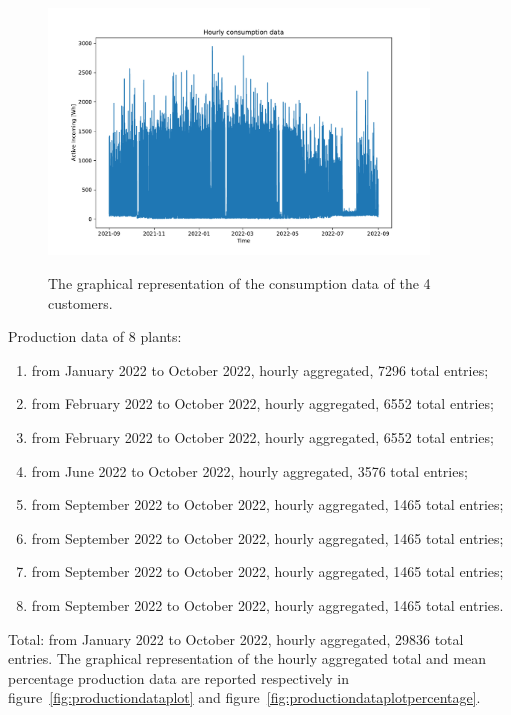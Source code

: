 \begin{figure}[H]
\begin{minipage}[b]{8.5cm}
\label{fig:dataplotcustomer3}
\end{minipage}
\ \hspace{2mm} \
\begin{minipage}[b]{8.5cm}
\centering
\includegraphics[width=0.9\textwidth]{images/baseline/data_plot_customer4}
\subcaption{Fourth customer.}
\label{fig:dataplotcustomer4}
\end{minipage}
\caption{The graphical representation of the consumption data of the 4 customers.}
\end{figure}

Production data of 8 plants:
\begin{enumerate}
  \item from January 2022 to October 2022, hourly aggregated, 7296 total entries;
  \item from February 2022 to October 2022, hourly aggregated, 6552 total entries;
  \item from February 2022 to October 2022, hourly aggregated, 6552 total entries;
  \item from June 2022 to October 2022, hourly aggregated, 3576 total entries;
  \item from September 2022 to October 2022, hourly aggregated, 1465 total entries;
  \item from September 2022 to October 2022, hourly aggregated, 1465 total entries;
  \item from September 2022 to October 2022, hourly aggregated, 1465 total entries;
  \item from September 2022 to October 2022, hourly aggregated, 1465 total entries.
\end{enumerate}
Total: from January 2022 to October 2022, hourly aggregated, 29836 total entries.
The graphical representation of the hourly aggregated total and mean percentage production data are reported respectively in figure~\ref{fig:productiondataplot} and figure~\ref{fig:productiondataplotpercentage}.

